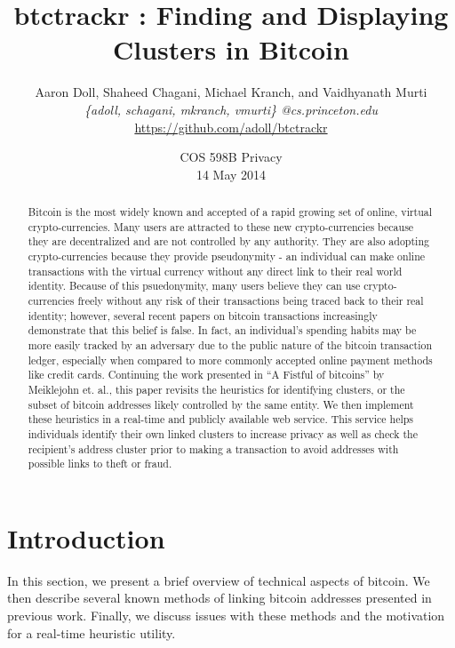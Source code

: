 \documentclass[10pt, letterpaper, twocolumn, twoside]{article}
\title{\bf btctrackr : Finding and Displaying Clusters in Bitcoin}
\author{Aaron Doll, Shaheed Chagani, Michael Kranch, and Vaidhyanath Murti\\
\textit{\{adoll, schagani, mkranch, vmurti\} @cs.princeton.edu}\\
\url{https://github.com/adoll/btctrackr}}
\date{COS 598B Privacy \\ 14 May 2014}
\begin{document}
\maketitle

\thispagestyle{empty}

\begin{abstract}
Bitcoin is the most widely known and accepted of a rapid growing set of online, virtual crypto-currencies. Many users are attracted to these new crypto-currencies because they are decentralized and are not controlled by any authority. They are also adopting crypto-currencies because they provide pseudonymity - an individual can make online transactions with the virtual currency without any direct link to their real world identity. Because of this psuedonymity, many users believe they can use crypto-currencies freely without any risk of their transactions being traced back to their real identity; however, several recent papers on bitcoin transactions increasingly demonstrate that this belief is false. In fact, an individual's spending habits may be more easily tracked by an adversary due to the public nature of the bitcoin transaction ledger, especially when compared to more commonly accepted online payment methods like credit cards. Continuing the work presented in ``A Fistful of bitcoins'' by Meiklejohn et. al.\cite{fistfull}, this paper revisits the heuristics for identifying clusters, or the subset of bitcoin addresses likely controlled by the same entity. We then implement these heuristics in a real-time and publicly available web service. This service helps individuals identify their own linked clusters to increase privacy as well as check the recipient's address cluster prior to making a transaction to avoid addresses with possible links to theft or fraud.  
\end{abstract}

\section{Introduction}
\label{intro}
In this section, we present a brief overview of technical aspects of bitcoin. We then describe several known methods of linking bitcoin addresses presented in previous work. Finally, we discuss issues with these methods and the motivation for a real-time heuristic utility. 
\end{document}
